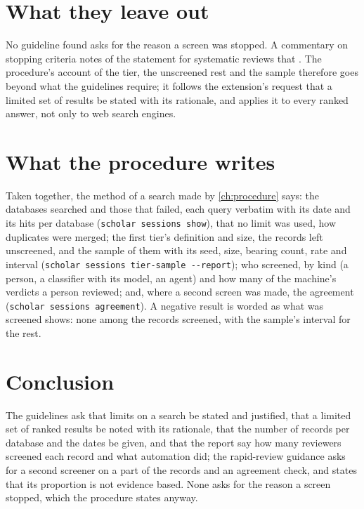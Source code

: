 \section{What they leave out}
\label{sec:reporting-gaps}

No guideline found asks for the reason a screen was stopped.
A commentary on stopping criteria notes of the statement for systematic
reviews that .
The procedure's account of the tier, the unscreened rest and the sample
therefore goes beyond what the guidelines require; it follows the
extension's request that a limited set of results be stated with its
rationale, and applies it to every ranked answer, not only to web
search engines.

\section{What the procedure writes}
\label{sec:reporting-procedure}

Taken together, the method of a search made by \cref{ch:procedure} says:
the databases searched and those that failed, each query verbatim with
its date and its hits per database (\texttt{scholar sessions show}), that
no limit was used, how duplicates were merged; the first tier's
definition and size, the records left unscreened, and the sample of them
with its seed, size, bearing count, rate and interval (\texttt{scholar
sessions tier-sample -{}-report}); who screened, by kind (a person, a
classifier with its model, an agent) and how many of the machine's
verdicts a person reviewed; and, where a second screen was made, the
agreement (\texttt{scholar sessions agreement}).
A negative result is worded as what was screened shows: none among the
records screened, with the sample's interval for the rest.

\section{Conclusion}
\label{sec:reporting-conclusion}

The guidelines ask that limits on a search be stated and justified, that
a limited set of ranked results be noted with its rationale, that the
number of records per database and the dates be given, and that the
report say how many reviewers screened each record and what automation
did; the rapid-review guidance asks for a second screener on a part of
the records and an agreement check, and states that its proportion is
not evidence based.
None asks for the reason a screen stopped, which the procedure states
anyway.

